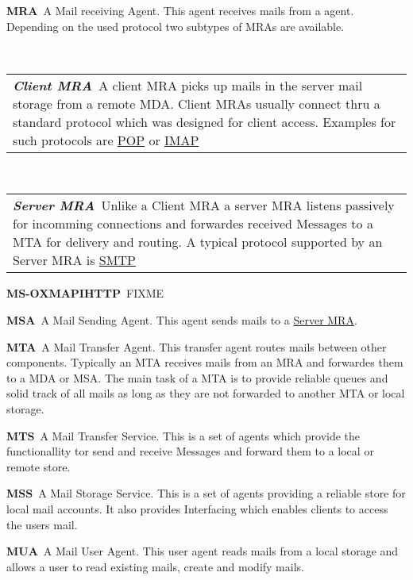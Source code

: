 \documentclass[10pt,a4paper]{scrbook}
\makeatletter
\newenvironment{entry}{\par\leavevmode\hangpara{1.5mm}{1}\ignorespaces}{\RaggedRight\par}
\newcommand*{\mainentry}[2]{{\bfseries{#1\label{def:#1}}}~#2\par}
\newcommand*{\subentry}[2]{\par~\begin{tabular}{p{\textwidth-.6cm}@{}}{\bfseries{\itshape{#1\label{def:#1}}}}~#2\end{tabular}}
\newcommand*{\defref}[1]{\hyperref[def:#1]{#1}}
\makeatother
\begin{document}
\begin{appendices}
\begin{entry}
  \mainentry{MRA}{A Mail receiving Agent. This agent receives mails from a agent. Depending on the used protocol two subtypes of MRAs are available.}
  \subentry{Client MRA}{A client MRA picks up mails in the server mail storage from a remote MDA. Client MRAs usually connect thru a standard protocol which was designed for client access. Examples for such protocols are \defref{POP} or \defref{IMAP}}
  \subentry{Server MRA}{Unlike a Client MRA a server MRA listens passively for incomming connections and forwardes received Messages to a MTA for delivery and routing. A typical protocol supported by an Server MRA is \defref{SMTP}}
\end{entry}

\begin{entry}
  \mainentry{MS-OXMAPIHTTP}{FIXME}
\end{entry}

\begin{entry}
  \mainentry{MSA}{A Mail Sending Agent. This agent sends mails to a \defref{Server MRA}. }
\end{entry}

\begin{entry}
  \mainentry{MTA}{A Mail Transfer Agent. This transfer agent routes mails between other components. Typically  an MTA receives mails from an MRA and forwardes them to a MDA or MSA. The main task of a MTA is to provide reliable queues and solid track of all mails as long as they are not forwarded to another MTA or local storage.}
\end{entry}

\begin{entry}
  \mainentry{MTS}{A Mail Transfer Service. This is a set of agents which provide the functionallity tor send and receive Messages and forward them to a local or remote store.}
\end{entry}

\begin{entry}
  \mainentry{MSS}{A Mail Storage Service. This is a set of agents providing a reliable store for local mail accounts. It also provides Interfacing which enables clients to access the users mail.}
\end{entry}

\begin{entry}
  \mainentry{MUA}{A Mail User Agent. This user agent reads mails from a local storage and allows a user to read existing mails, create and modify mails.}
\end{entry}


\end{appendices}
\end{document}
